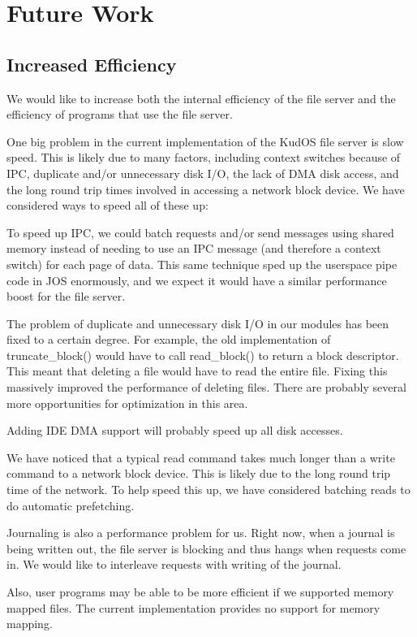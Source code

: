 \section{Future Work}
\label{sec:future}

\subsection{Increased Efficiency}
\label{sec:future:efficiency}

We would like to increase both the internal efficiency of the file server and
the efficiency of programs that use the file server.

One big problem in the current implementation of the KudOS file server is slow
speed. This is likely due to many factors, including context switches because of
IPC, duplicate and/or unnecessary disk I/O, the lack of DMA disk access, and the
long round trip times involved in accessing a network block device. We have
considered ways to speed all of these up:

To speed up IPC, we could batch requests and/or send messages using shared
memory instead of needing to use an IPC message (and therefore a context switch)
for each page of data. This same technique sped up the userspace pipe code in
JOS enormously, and we expect it would have a similar performance boost for the
file server.

The problem of duplicate and unnecessary disk I/O in our modules has been fixed
to a certain degree. For example, the old implementation of truncate\_block()
would have to call read\_block() to return a block descriptor. This meant that
deleting a file would have to read the entire file. Fixing this massively
improved the performance of deleting files. There are probably several more
opportunities for optimization in this area.

Adding IDE DMA support will probably speed up all disk accesses.

We have noticed that a typical read command takes much longer than a write
command to a network block device. This is likely due to the long round trip
time of the network. To help speed this up, we have considered batching reads to
do automatic prefetching.

Journaling is also a performance problem for us. Right now, when a journal is
being written out, the file server is blocking and thus hangs when requests come
in. We would like to interleave requests with writing of the journal.

Also, user programs may be able to be more efficient if we supported memory
mapped files. The current implementation provides no support for memory mapping.

